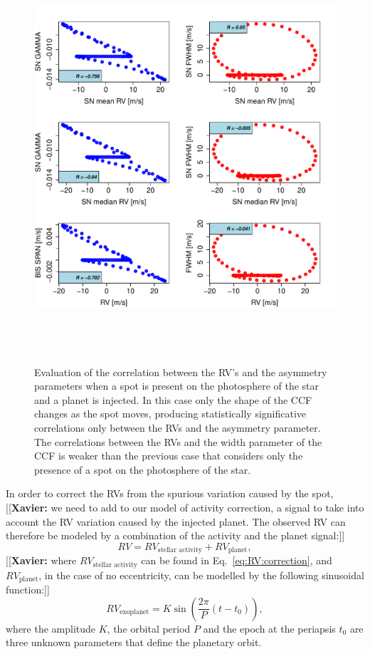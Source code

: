 \documentclass[11pt, oneside]{article}
\newcommand{\xavier}[1]{{\color{blue}[[\textbf{Xavier: }#1]]}}
\begin{document}
\begin{figure}[htbp]
   \centering
\includegraphics[height = 6in]{SOAP_SPOT_PLANET_Comparison_para_SN.pdf} 
   \caption{Evaluation of the correlation between the RV's and the asymmetry parameters when a spot is present on the photosphere of the star and a planet is injected.  In this case only the shape of the CCF changes as the spot moves, producing statistically significative correlations only between the RVs and the asymmetry parameter. The correlations between the RVs and the width parameter of the CCF is weaker than the previous case that considers only the presence of a spot on the photosphere of the star.}
    \label{fig:spot.plus.planet.corr}
\end{figure}

In order to correct the RVs from the spurious variation caused by the spot, \xavier{we need to add to our model of activity correction, a signal to take into account the RV variation caused by the injected planet. The observed RV can therefore be modeled by a combination of the activity and the planet signal:}
%
\begin{equation}
RV= RV_{\text{stellar activity}} + RV_{\text{planet}},
\label{eq:RV:correction.overall}
\end{equation}
%
\xavier{where $RV_{\text{stellar activity}}$ can be found in Eq.~\ref{eq:RV:correction}, and $RV_{\text{planet}}$, in the case of no eccentricity, can be modelled by the following sinusoidal function:}
%
\begin{equation}
RV_{\text{exoplanet}}= K \sin \left(\frac{2 \pi}{P} (t - t_{0})\right),
\label{eq:RV:correction.planet}
\end{equation}
%
where the amplitude $K$, the orbital period $P$ and the epoch at the periapsis $t_{0}$ are three unknown parameters that define the planetary orbit.
\end{document}
